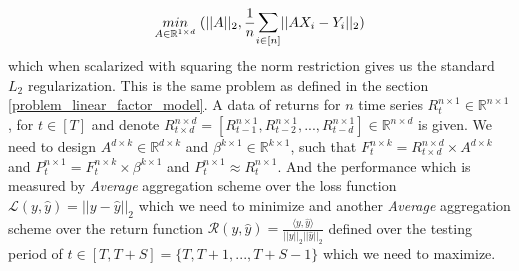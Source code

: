 \begin{equation} \label{fmoop_l2_rel_obj_new}
    \underset{A \in \mathbb{R}^{1\times d}}{min}\hspace{1mm} (||A||_2, \frac{1}{n}\mathlarger{\sum}_{i\in [n]} ||AX_i-Y_i||_2)
\end{equation}
which when scalarized with squaring the norm restriction gives us the standard $L_2$ regularization.
\newpage 
{}
 \label{results_problem_1}
This is the same problem as defined in the section \ref{problem_linear_factor_model}.
\newline A data of returns for $n$ time series $R^{n\times 1}_t \in \mathbb{R}^{n\times 1}$, for $t\in [T]$ and denote $R^{n\times d}_{t\times d} = [R^{n\times 1}_{t-1},R^{n\times 1}_{t-2},...,R^{n\times 1}_{t-d}] \in \mathbb{R}^{n\times d}$ is given.
\newline \newline We need to design $A^{d\times k} \in  \mathbb{R}^{d\times k}$ and $\beta^{k\times 1} \in \mathbb{R}^{k\times 1}$, such that $F^{n\times k}_t = R^{n\times d}_{t\times d}\times A^{d\times k}$ and $P^{n \times 1}_{t} = F^{n\times k}_t \times \beta^{k \times 1}$ and $P^{n \times 1}_{t} \approx R^{n \times 1}_{t}$. And the performance  which is measured by \textit{Average} aggregation scheme over the loss function $\mathcal{L}(y,\hat{y}) = ||y-\hat{y}||_2$ which we need to minimize and another \textit{Average} aggregation scheme over the return function $\mathcal{R}(y,\hat{y}) = \frac{\langle y,\hat{y}\rangle}{||y||_2||\hat{y}||_2}$ defined over the testing period of $t \in [T,T+S]= \{T,T+1,...,T+S-1\}$ which we need to maximize.

